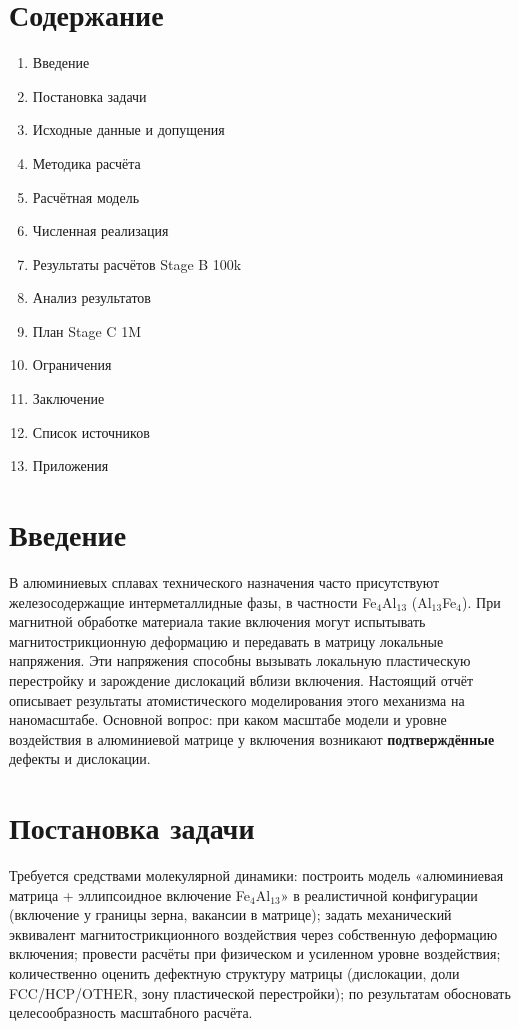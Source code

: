 \documentclass[14pt,a4paper]{extarticle}
\begin{document}
\section*{Содержание}
\begin{enumerate}[leftmargin=2.2em,itemsep=0pt]
\item Введение
\item Постановка задачи
\item Исходные данные и допущения
\item Методика расчёта
\item Расчётная модель
\item Численная реализация
\item Результаты расчётов Stage B 100k
\item Анализ результатов
\item План Stage C 1M
\item Ограничения
\item Заключение
\item Список источников
\item Приложения
\end{enumerate}
\newpage

\section{Введение}
В алюминиевых сплавах технического назначения часто присутствуют железосодержащие интерметаллидные фазы, в частности Fe$_4$Al$_{13}$ (Al$_{13}$Fe$_4$). При магнитной обработке материала такие включения могут испытывать магнитострикционную деформацию и передавать в матрицу локальные напряжения. Эти напряжения способны вызывать локальную пластическую перестройку и зарождение дислокаций вблизи включения. Настоящий отчёт описывает результаты атомистического моделирования этого механизма на наномасштабе. Основной вопрос: при каком масштабе модели и уровне воздействия в алюминиевой матрице у включения возникают \textbf{подтверждённые} дефекты и дислокации.

\section{Постановка задачи}
Требуется средствами молекулярной динамики: построить модель «алюминиевая матрица + эллипсоидное включение Fe$_4$Al$_{13}$» в реалистичной конфигурации (включение у границы зерна, вакансии в матрице); задать механический эквивалент магнитострикционного воздействия через собственную деформацию включения; провести расчёты при физическом и усиленном уровне воздействия; количественно оценить дефектную структуру матрицы (дислокации, доли FCC/HCP/OTHER, зону пластической перестройки); по результатам обосновать целесообразность масштабного расчёта.
\end{document}
